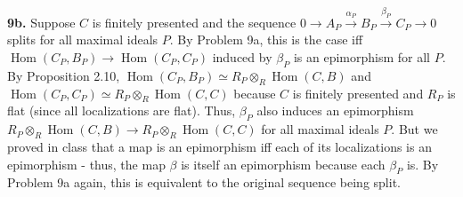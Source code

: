 \documentclass[11pt]{article}
\newcommand{\num}[1]{\noindent \textbf{#1}}
\newcommand{\Hom}{\operatorname{Hom}}
\theoremstyle{definition}
\begin{document}
\num{9b.} Suppose $C$ is finitely presented and the sequence $0\rightarrow A_P\stackrel{\alpha_P}{\rightarrow}B_P\stackrel{\beta_P}{\rightarrow}C_P\rightarrow0$ splits for all maximal ideals $P$. By Problem 9a, this is the case iff $\Hom(C_P,B_P)\rightarrow\Hom(C_P,C_P)$ induced by $\beta_P$ is an epimorphism for all $P$. By Proposition 2.10, $\Hom(C_P,B_P)\simeq R_P\otimes_R\Hom(C,B)$ and $\Hom(C_P,C_P)\simeq R_P\otimes_R\Hom(C,C)$ because $C$ is finitely presented and $R_P$ is flat (since all localizations are flat). Thus, $\beta_P$ also induces an epimorphism $R_P\otimes_R\Hom(C,B)\rightarrow R_P\otimes_R\Hom(C,C)$ for all maximal ideals $P$. But we proved in class that a map is an epimorphism iff each of its localizations is an epimorphism - thus, the map $\beta$ is itself an epimorphism because each $\beta_P$ is. By Problem 9a again, this is equivalent to the original sequence being split.
\end{document}
